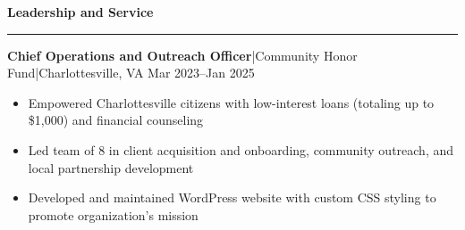 \documentclass[11pt,letterpaper]{article}
\newcommand{\horibar}[2]{#1\hspace{5pt}|\hspace{5pt}#2}
\newcommand{\sep}[1]{\par\vspace{#1}}
\renewenvironment{section}[1]{
\sep{11pt}
{
\fontsize{14}{2}
\selectfont
\textbf{#1}\\[0.5pt]
}
\sep{4pt}
\noindent\rule{\linewidth}{0.5pt}
\sep{4pt}
}
{
}
\renewenvironment{subsection}[3]
{
\sep{4pt}
\horibar{\textbf{#1}}{#2} \hfill #3
\par\setstretch{1}
\begin{itemize}
}
{
\end{itemize}
\setstretch{0}
}
\begin{document}
\begin{section}{Leadership and Service}
    \begin{subsection}{Chief Operations and Outreach Officer}{\horibar{Community Honor Fund}{Charlottesville, VA}}{Mar 2023–Jan 2025}
        \item Empowered Charlottesville citizens with low-interest loans (totaling up to \$1,000) and financial counseling
        \item Led team of 8 in client acquisition and onboarding, community outreach, and local partnership development
        \item Developed and maintained WordPress website with custom CSS styling to promote organization’s mission
    \end{subsection}
\end{section}
\end{document}
